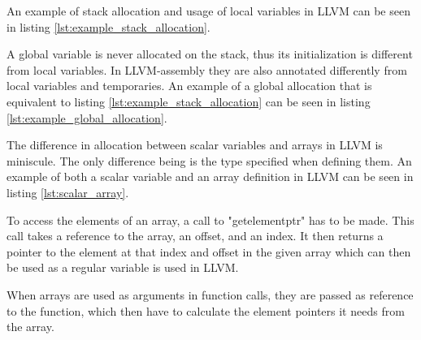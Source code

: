 An example of stack allocation and usage of local variables in LLVM can be seen in listing \ref{lst:example_stack_allocation}.



A global variable is never allocated on the stack, thus its initialization is different from local variables. In LLVM-assembly they are also annotated differently from local variables and temporaries.
An example of a global allocation that is equivalent to listing \ref{lst:example_stack_allocation} can be seen in listing \ref{lst:example_global_allocation}.



The difference in allocation between scalar variables and arrays in LLVM is miniscule. The only difference being is the type specified when defining them. An example of both a scalar variable and an array definition in LLVM can be seen in listing \ref{lst:scalar_array}.

To access the elements of an array, a call to "getelementptr" has to be made. This call takes a reference to the array, an offset, and an index. It then returns a pointer to the element at that index and offset in the given array which can then be used as a regular variable is used in LLVM.

When arrays are used as arguments in function calls, they are passed as reference to the function, which then have to calculate the element pointers it needs from the array.



